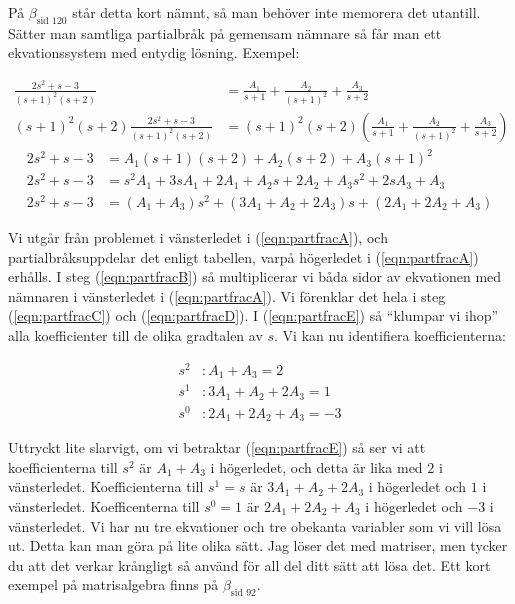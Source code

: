 \documentclass[a4paper]{article}
\newcommand{\mhb}[1]{$\beta_{\text{#1}}$}     %
\begin{document}
På \mhb{sid 120} står detta kort nämnt, så man behöver inte memorera det utantill. Sätter man samtliga partialbråk på gemensam nämnare så får man ett ekvationssystem med entydig lösning. Exempel:

\begin{align}
  \frac{2s^2 + s -3}{(s+1)^2(s+2)} &= \frac{A_1}{s+1} + \frac{A_2}{(s+1)^2} + \frac{A_3}{s+2} \label{eqn:partfracA}\\
  (s+1)^2(s+2) \frac{2s^2 + s -3}{(s+1)^2(s+2)} &= (s+1)^2(s+2) \left( \frac{A_1}{s+1} + \frac{A_2}{(s+1)^2} + \frac{A_3}{s+2} \right) \label{eqn:partfracB}
\end{align}
\vspace{-7mm}
\begin{align}
  2s^2 + s -3 &= A_1(s+1)(s+2) + A_2(s+2) + A_3(s+1)^2 \label{eqn:partfracC}\\
  2s^2 + s -3 &= s^2A_1 + 3sA_1 + 2A_1 + A_2s + 2A_2 + A_3s^2 + 2sA_3 + A_3 \label{eqn:partfracD}\\
  2s^2 + s -3 &= (A_1 + A_3)s^2 + (3A_1 + A_2 + 2A_3)s + (2A_1 + 2A_2 + A_3) \label{eqn:partfracE}
\end{align}

Vi utgår från problemet i vänsterledet i (\ref{eqn:partfracA}), och partialbråksuppdelar det enligt tabellen, varpå högerledet i (\ref{eqn:partfracA}) erhålls. I steg (\ref{eqn:partfracB}) så multiplicerar vi båda sidor av ekvationen med nämnaren i vänsterledet i (\ref{eqn:partfracA}). Vi förenklar det hela i steg (\ref{eqn:partfracC}) och (\ref{eqn:partfracD}). I (\ref{eqn:partfracE}) så ``klumpar vi ihop'' alla koefficienter till de olika gradtalen av $s$. Vi kan nu identifiera koefficienterna:

\begin{align*}
  s^2 &: A_1 + A_3 = 2\\
  s^1 &: 3A_1 + A_2 + 2A_3 = 1\\
  s^0 &: 2A_1 + 2A_2 + A_3 = -3
\end{align*}

Uttryckt lite slarvigt, om vi betraktar (\ref{eqn:partfracE}) så ser vi att koefficienterna till $s^2$ är $A_1 + A_3$ i högerledet, och detta är lika med $2$ i vänsterledet. Koefficienterna till $s^1 = s$ är $3A_1 + A_2 + 2A_3$ i högerledet och $1$ i vänsterledet. Koefficenterna till $s^0 = 1$ är $2A_1 + 2A_2 + A_3$ i högerledet och $-3$ i vänsterledet. Vi har nu tre ekvationer och tre obekanta variabler som vi vill lösa ut. Detta kan man göra på lite olika sätt. Jag löser det med matriser, men tycker du att det verkar krångligt så använd för all del ditt sätt att lösa det. Ett kort exempel på matrisalgebra finns på \mhb{sid 92}.
\end{document}
